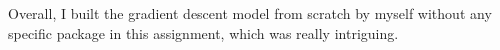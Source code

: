 \documentclass[12pt, a4paper]{article}
\begin{document}
Overall, I built the gradient descent model from scratch by myself without any specific package in this assignment, which was really intriguing. 

%
\end{document}
